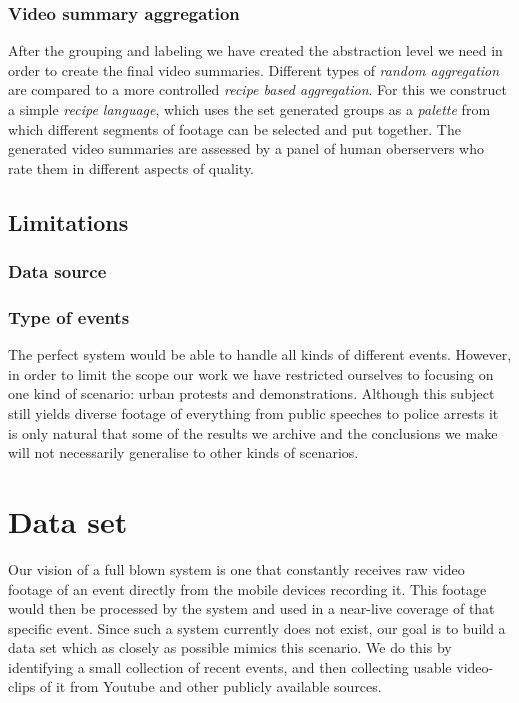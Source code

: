 \subsubsection{Video summary aggregation}
%
After the grouping and labeling we have created the abstraction level we need in order to create the final video summaries. Different types of \textit{random aggregation} are compared to a more controlled \textit{recipe based aggregation}. For this we construct a simple \textit{recipe language}, which uses the set generated groups as a \textit{palette} from which different segments of footage can be selected and put together. The generated video summaries are assessed by a panel of human oberservers who rate them in different aspects of quality.
%
\subsection{Limitations}
%
%
\subsubsection{Data source}
%
%
\subsubsection{Type of events}
%
The perfect system would be able to handle all kinds of different events. However, in order to limit the scope our work we have restricted ourselves to focusing on one kind of scenario: urban protests and demonstrations. Although this subject still yields diverse footage of everything from public speeches to police arrests it is only natural that some of the results we archive and the conclusions we make will not necessarily generalise to other kinds of scenarios.
%
\section{Data set}
\label{sec:dataset}
%
Our vision of a full blown system is one that constantly receives raw video footage of an event directly from the mobile devices recording it. This footage would then be processed by the system and used in a near-live coverage of that specific event. Since such a system currently does not exist, our goal is to build a data set which as closely as possible mimics this scenario. We do this by identifying a small collection of recent events, and then collecting usable video-clips of it from Youtube and other publicly available sources.
%
